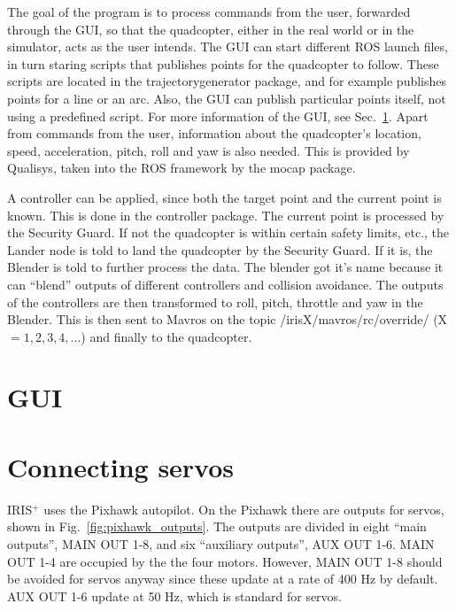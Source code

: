 \documentclass[titlepage,11pt,a4paper]{article}
\begin{document}
The goal of the program is to process commands from the user,
forwarded through the GUI, so that the quadcopter, either in the real
world or in the simulator, acts as the user intends. The GUI can start
different ROS launch files, in turn staring scripts that publishes
points for the quadcopter to follow. These scripts are located in the
trajectory\textunderscore generator package, and for example publishes
points for a line or an arc. Also, the GUI can publish particular
points itself, not using a predefined script. For more information of
the GUI, see Sec.~\ref{sec:gui}. Apart from commands from the user,
information about the quadcopter's location, speed, acceleration,
pitch, roll and yaw is also needed. This is provided by Qualisys,
taken into the ROS framework by the mocap package.

A controller can be applied, since both the target point and the
current point is known. This is done in the controller package. The
current point is processed by the Security Guard. If not the
quadcopter is within certain safety limits, etc., the Lander node is
told to land the quadcopter by the Security Guard. If it is, the
Blender is told to further process the data. The blender got it's name
because it can ``blend'' outputs of different controllers and
collision avoidance. The outputs of the controllers are then
transformed to roll, pitch, throttle and yaw in the Blender. This is
then sent to Mavros on the topic /irisX/mavros/rc/override/ (X $= 1,
2, 3, 4, \dots$) and finally to the quadcopter.


\section{GUI}
\label{sec:gui}

\section{Connecting servos}
\label{sec:servos}
IRIS$^+$ uses the Pixhawk autopilot. On the Pixhawk there are outputs
for servos, shown in Fig.~\ref{fig:pixhawk_outputs}. The outputs are
divided in eight ``main outputs'', MAIN OUT 1-8, and six ``auxiliary
outputs'', AUX OUT 1-6. MAIN OUT 1-4 are occupied by the the four
motors. However, MAIN OUT 1-8 should be avoided for servos anyway
since these update at a rate of 400 Hz by default. AUX OUT 1-6 update
at 50 Hz, which is standard for servos.
\end{document}
